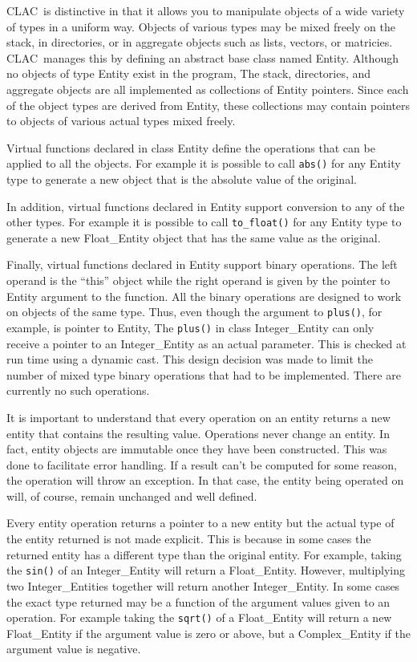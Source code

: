 \documentclass{report}
\newcommand{\CLAC}{CLAC}
\begin{document}
\CLAC\ is distinctive in that it allows you to manipulate objects of a wide variety of types in a uniform way. Objects of various types may be mixed freely on the stack, in directories, or in aggregate objects such as lists, vectors, or matricies. \CLAC\ manages this by defining an abstract base class named Entity. Although no objects of type Entity exist in the program, The stack, directories, and aggregate objects are all implemented as collections of Entity pointers. Since each of the object types are derived from Entity, these collections may contain pointers to objects of various actual types mixed freely.

Virtual functions declared in class Entity define the operations that can be applied to all the objects. For example it is possible to call \texttt{abs()} for any Entity type to generate a new object that is the absolute value of the original.

In addition, virtual functions declared in Entity support conversion to any of the other types. For example it is possible to call \texttt{to\_float()} for any Entity type to generate a new Float\_Entity object that has the same value as the original.

Finally, virtual functions declared in Entity support binary operations. The left operand is the ``this'' object while the right operand is given by the pointer to Entity argument to the function. All the binary operations are designed to work on objects of the same type. Thus, even though the argument to \texttt{plus()}, for example, is pointer to Entity, The \texttt{plus()} in class Integer\_Entity can only receive a pointer to an Integer\_Entity as an actual parameter. This is checked at run time using a dynamic cast. This design decision was made to limit the number of mixed type binary operations that had to be implemented. There are currently no such operations.

It is important to understand that every operation on an entity returns a new entity that contains the resulting value. Operations never change an entity. In fact, entity objects are immutable once they have been constructed. This was done to facilitate error handling. If a result can't be computed for some reason, the operation will throw an exception. In that case, the entity being operated on will, of course, remain unchanged and well defined.

Every entity operation returns a pointer to a new entity but the actual type of the entity returned is not made explicit. This is because in some cases the returned entity has a different type than the original entity. For example, taking the \texttt{sin()} of an Integer\_Entity will return a Float\_Entity. However, multiplying two Integer\_Entities together will return another Integer\_Entity. In some cases the exact type returned may be a function of the argument values given to an operation. For example taking the \texttt{sqrt()} of a Float\_Entity will return a new Float\_Entity if the argument value is zero or above, but a Complex\_Entity if the argument value is negative.
\end{document}
